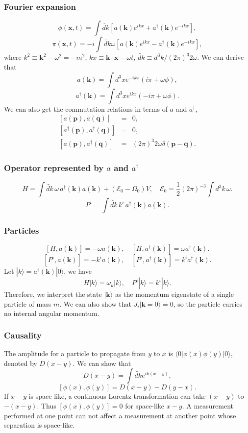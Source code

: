 \subsubsection{Fourier expansion}
\[\phi(\bm{x},t) = \int \widetilde{dk} \left[ a(\bm{k})e^{ikx} + a^{\dagger}(\bm{k})e^{-ikx} \right],\]
\[\pi(\bm{x},t) = -i \int  \widetilde{dk} \omega \left[ a(\bm{k})e^{ikx} - a^{\dagger}(\bm{k})e^{-ikx} \right],\]
where $k^2 \equiv \bm{k}^2 - \omega^2 = -m^2$, $kx \equiv \bm{k}\cdot \bm{x} - \omega t$, $\widetilde{dk} \equiv {d^3k}/{(2\pi)^3 2\omega}$. 
We can derive that
\[a(\bm{k}) = \int d^3 x e^{-ikx}(i\pi+\omega \phi),\]
\[a^{\dagger}(\bm{k}) = \int d^3 x e^{ikx}(-i\pi+\omega \phi).\]
We can also get the commutation relations in terms of $a$ and $a^{\dagger}$,
\begin{eqnarray}
\left[a(\bm{p}),a(\bm{q})\right] &=& 0 ,\nonumber \\
\left[a^{\dagger}(\bm{p}),a^{\dagger}(\bm{q})\right] &=& 0, \nonumber \\
\left[a(\bm{p}),a^{\dagger}(\bm{q})\right] &=& (2\pi)^3 2\omega \delta(\bm{p}-\bm{q}) .\nonumber
\end{eqnarray}

\subsubsection{Operator represented by $a$ and $a^{\dagger}$}
\[H=\int \widetilde{dk}\, \omega\, a^{\dagger}(\bm{k})a(\bm{k}) + (\mathcal{E}_0 - \Omega_0)V , \quad \mathcal{E}_0 = \frac{1}{2}(2\pi)^{-3}\int d^3 k \,\omega.\]
\[P^{i}=\int \widetilde{dk}\, k^{i}\, a^{\dagger}(\bm{k})a(\bm{k}) .\]

\subsubsection{Particles}
\[[H,a(\bm{k})] = -\omega a(\bm{k}) , \quad [H,a^{\dagger}(\bm{k})] = \omega a^{\dagger}(\bm{k}).\]
\[[P^i,a(\bm{k})] = -k^i a(\bm{k}) , \quad [P^i,a^{\dagger}(\bm{k})] = k^i a^{\dagger}(\bm{k}).\]
Let $|k\rangle = a^{\dagger}(\bm{k})|0\rangle $, we have
\[H |k\rangle = \omega_k|k\rangle , \quad P^i |k\rangle = k^i|k\rangle.\]
Therefore, we interpret the state $|\bm{k}\rangle$ as the momentum eigenstate of a single particle of mass $m$. We can also show that 
$J_i|\bm{k} = 0\rangle = 0$, so the particle carries no internal angular momentum.

\subsubsection{Causality}
The amplitude for a particle to propagate from $y$ to $x$ is $\langle 0 | \phi(x) \phi(y) | 0 \rangle$, denoted by $D(x-y)$.
We can show that
\[D(x-y) = \int \widetilde{dk} e^{ik(x-y)},\]
\[[\phi(x),\phi(y)] = D(x-y) -D(y-x).\]
If $x-y$ is space-like, a continuous Lorentz transformation can take $(x-y)$ to $-(x-y)$. Thus $[\phi(x),\phi(y)] =0$ for space-like $x-y$. A measurement performed at one point can not affect a measurement at another point whose separation is space-like.
